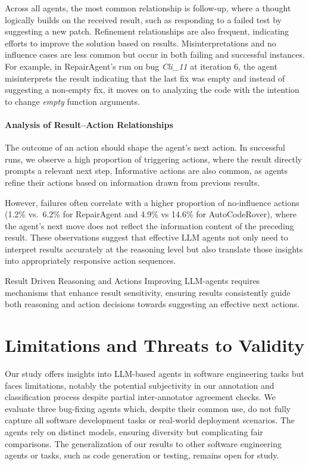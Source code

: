 \documentclass[conference,10pt]{IEEEtran}
\theoremstyle{definition}        %
\newcommand{\ra}{Repair\-Agent}
\newcommand{\acr}{Auto\-Code\-Rover}
\begin{document}
Across all agents, the most common relationship is follow-up, where a thought logically builds on the received result, such as responding to a failed test by suggesting a new patch.
Refinement relationships are also frequent, indicating efforts to improve the solution based on results.
Misinterpretations and no influence cases are less common but occur in both failing and successful instances. For example, in \ra{}’s run on bug \textit{Cli\_11} at iteration 6, the agent misinterprets the result indicating that the last fix was empty and instead of suggesting a non-empty fix, it moves on to analyzing the code with the intention to change \textit{empty} function arguments.


\paragraph{Analysis of Result–Action Relationships}
The outcome of an action should shape the agent's next action.
In successful runs, we observe a high proportion of triggering actions, where the result directly prompts a relevant next step.
Informative actions are also common, as agents refine their actions based on information drawn from previous results.

However, failures often correlate with a higher proportion of no-influence actions (1.2\% vs.\ 6.2\% for \ra{} and 4.9\% vs 14.6\% for \acr{}), where the agent’s next move does not reflect the information content of the preceding result. These observations suggest that effective LLM agents not only need to interpret results accurately at the reasoning level but also translate those insights into appropriately responsive action sequences.

\begin{findingsbox}{Result Driven Reasoning and Actions}  
Improving LLM-agents requires mechanisms that enhance result sensitivity, ensuring results consistently guide both reasoning and action decisions towards suggesting an effective next actions.
\end{findingsbox}


\section{Limitations and Threats to Validity}  

Our study offers insights into LLM-based agents in software engineering tasks but faces limitations, notably the potential subjectivity in our annotation and classification process despite partial inter-annotator agreement checks. We evaluate three bug-fixing agents which, despite their common use, do not fully capture all software development tasks or real-world deployment scenarios. The agents rely on distinct models, ensuring diversity but complicating fair comparisons. The generalization of our results to other software engineering agents or tasks, such as code generation or testing, remains open for study.
\end{document}
